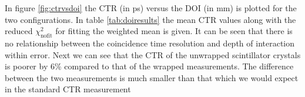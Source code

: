 In figure \ref{fig:ctrvsdoi} the CTR (in ps) versus the DOI (in mm) is plotted for the two configurations. In table \ref{tab:doiresults} the mean CTR values along with the reduced $\chi^2_\text{nofit}$ for fitting the weighted mean is given. It can be seen that there is no relationship between the coincidence time resolution and depth of interaction within error. Next we can see that the CTR of the unwrapped scintillator crystals is poorer by 6\% compared to that of the wrapped measurements. The difference between the two measurements is much smaller than that which we would expect in the standard CTR measurement\cite{uffray_Jarron_Meyer_Lecoq_2013}